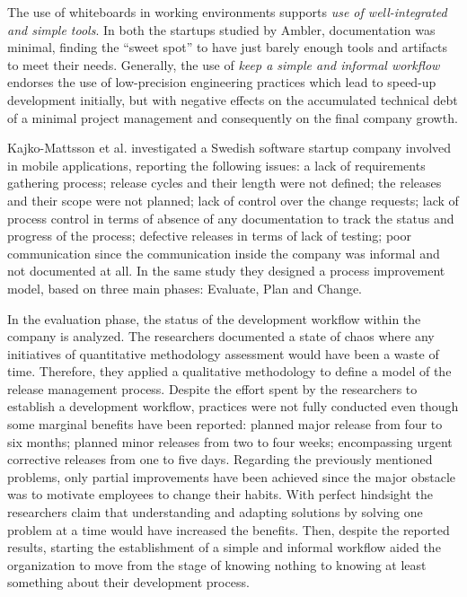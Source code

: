 \documentclass[10pt,journal,letterpaper,compsoc]{IEEEtran}
\begin{document}
The use of whiteboards in working environments supports \textit{use of 
well-integrated and simple tools}. In both the startups studied by Ambler, 
documentation was minimal, finding the ``sweet spot'' to have just barely enough 
tools and artifacts to meet their needs. Generally, the use of \textit{keep a 
simple and informal workflow} endorses the use of low-precision engineering 
practices which lead to speed-up development initially, but with negative 
effects on the accumulated technical debt of a minimal project management and 
consequently on the final company growth. 

Kajko-Mattsson et al. \cite{Kajko-Mattsson2008} investigated a Swedish software 
startup company involved in mobile applications, reporting the following issues: 
a lack of requirements gathering process; release cycles and their length were 
not defined; the releases and their scope were not planned; lack of control over 
the change requests; lack of process control in terms of  absence of any 
documentation to track the status and progress of the process; defective 
releases in terms of lack of testing; poor communication since the communication 
inside the company was informal and not documented at all. In the same study 
they designed a process improvement model, based on three main phases: Evaluate, 
Plan and Change. 

In the evaluation phase, the status of the development workflow within the 
company  is analyzed. The researchers documented a state of chaos where any 
initiatives of quantitative methodology assessment would have been a waste of 
time. Therefore, they applied a qualitative methodology to define a model of the 
release management process. 
Despite the effort 
spent by the researchers to establish a development workflow, practices were not 
fully conducted even though some marginal benefits have been reported: planned 
major release from four to six months; planned minor releases from two to four 
weeks; encompassing urgent corrective releases from one to five days. Regarding 
the previously mentioned problems, only 
partial improvements have been achieved since the major obstacle was to 
motivate employees to change their habits. With perfect hindsight the 
researchers claim that understanding and adapting solutions by solving one 
problem at a time would have increased the benefits. Then, despite the reported 
results, starting the establishment of a simple and informal workflow aided the 
organization to move from the stage of knowing nothing to knowing at least 
something about their development process. 
\end{document}
